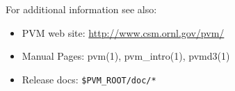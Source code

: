 \noindent For additional information see also:
\begin{itemize}
        \item PVM web site: \url{http://www.csm.ornl.gov/pvm/}
        \item Manual Pages: pvm(1), pvm\_intro(1), pvmd3(1)
        \item Release docs: \verb=$PVM_ROOT/doc/*=
\end{itemize}

